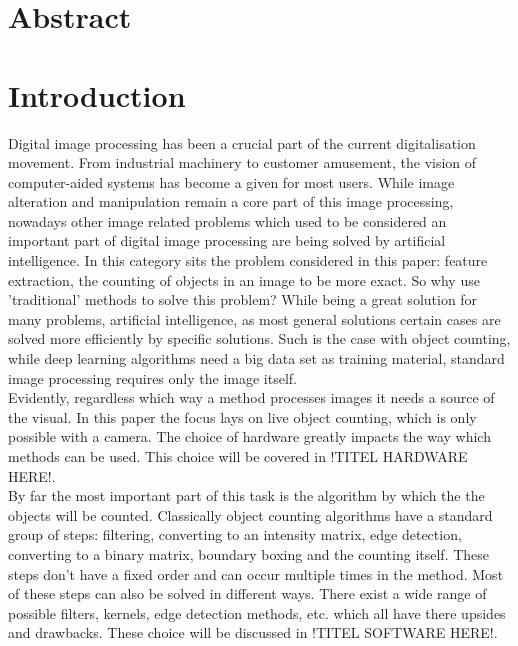 \documentclass[11pt]{article}
\begin{document}


\section*{Abstract}
\thispagestyle{empty}

\newpage
\tableofcontents
\thispagestyle{empty}

\newpage
\listoftables
\thispagestyle{empty}

\newpage
\listoffigures
\thispagestyle{empty}

\newpage
\section{Introduction}
Digital image processing has been a crucial part of the current digitalisation movement. From industrial machinery to customer amusement, the vision of computer-aided systems has become a given for most users. While image alteration and manipulation remain a core part of this image processing, nowadays other image related problems which used to be considered an important part of digital image processing are being solved by artificial intelligence. In this category sits the problem considered in this paper: feature extraction, the counting of objects in an image to be more exact. So why use 'traditional' methods to solve this problem? While being a great solution for many problems, artificial intelligence, as most general solutions certain cases are solved more efficiently by specific solutions. Such is the case with object counting, while deep learning algorithms need a big data set  as training material, standard image processing requires only the image itself.\\
Evidently, regardless which way a method processes images it needs a source of the visual. In this paper the focus lays on live object counting, which is only possible with a camera. The choice of hardware greatly impacts the way which methods can be used. This choice will be covered in !TITEL HARDWARE HERE!.\\ 
By far the most important part of this task is the algorithm by which the the objects will be counted. Classically object counting algorithms have a standard group of steps: filtering, converting to an intensity matrix, edge detection, converting to a binary matrix, boundary boxing and the counting itself. These steps don't have a fixed order and can occur multiple times in the method. Most of these steps can also be solved in different ways. There exist a wide range of possible filters, kernels, edge detection methods, etc. which all have there upsides and drawbacks. These choice will be discussed in !TITEL SOFTWARE HERE!.
\end{document}
